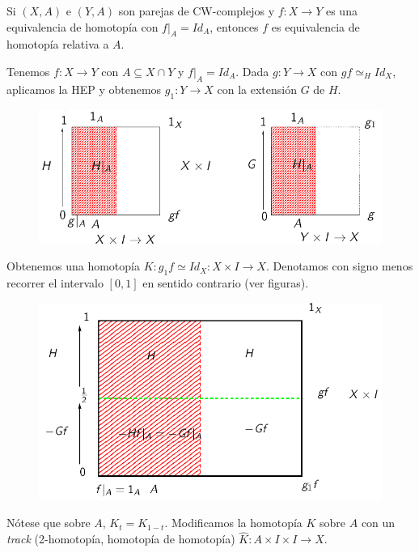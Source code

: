 \documentclass[TA.tex]{subfiles}
\begin{document}
\begin{prop}
Si $(X,A)$ e $(Y,A)$ son parejas de CW-complejos y $f:X\to Y$ es una equivalencia de homotopía con $f|_{A}=Id_A$, entonces $f$ es equivalencia de homotopía relativa a $A$.
\end{prop}
\begin{dem}
Tenemos $f:X\to Y$ con $A\subseteq X\cap Y$ y $f|_{A}=Id_A$. Dada $g:Y\to X$ con $gf\simeq_H Id_X$, aplicamos la HEP y obtenemos $g_1:Y\to X$ con la extensión $G$ de $H$. 

\begin{figure}[h!]
\includegraphics[scale=0.6]{extension}
\end{figure}
Obtenemos una homotopía $K:g_1f\simeq Id_X: X\times I\to X$. Denotamos con signo menos recorrer el intervalo $[0,1]$ en sentido contrario (ver figuras).

\begin{figure}[h!]
\includegraphics[scale=0.6]{k}
\end{figure}

Nótese que sobre $A$, $K_t=K_{1-t}$. Modificamos la homotopía $K$ sobre $A$ con un \emph{track} (2-homotopía, homotopía de homotopía) $\widehat{K}:A\times I\times I\to X$.


\end{dem}
\end{document}
